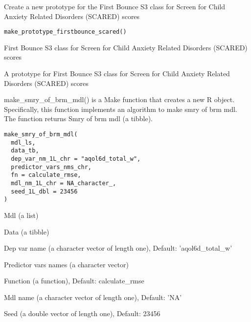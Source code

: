 \documentclass[a4paper]{book}
\begin{document}
%
\begin{Description}\relax
Create a new prototype for the First Bounce S3 class for Screen for Child Anxiety Related Disorders (SCARED) scores
\end{Description}
%
\begin{Usage}
\begin{verbatim}
make_prototype_firstbounce_scared()
\end{verbatim}
\end{Usage}
%
\begin{Details}\relax
First Bounce S3 class for Screen for Child Anxiety Related Disorders (SCARED) scores
\end{Details}
%
\begin{Value}
A prototype for First Bounce S3 class for Screen for Child Anxiety Related Disorders (SCARED) scores
\end{Value}
%
\begin{Description}\relax
make\_smry\_of\_brm\_mdl() is a Make function that creates a new R object. Specifically, this function implements an algorithm to make smry of brm mdl. The function returns Smry of brm mdl (a tibble).
\end{Description}
%
\begin{Usage}
\begin{verbatim}
make_smry_of_brm_mdl(
  mdl_ls,
  data_tb,
  dep_var_nm_1L_chr = "aqol6d_total_w",
  predictor_vars_nms_chr,
  fn = calculate_rmse,
  mdl_nm_1L_chr = NA_character_,
  seed_1L_dbl = 23456
)
\end{verbatim}
\end{Usage}
%
\begin{Arguments}
\begin{ldescription}
\item[\code{mdl\_ls}] Mdl (a list)

\item[\code{data\_tb}] Data (a tibble)

\item[\code{dep\_var\_nm\_1L\_chr}] Dep var name (a character vector of length one), Default: 'aqol6d\_total\_w'

\item[\code{predictor\_vars\_nms\_chr}] Predictor vars names (a character vector)

\item[\code{fn}] Function (a function), Default: calculate\_rmse

\item[\code{mdl\_nm\_1L\_chr}] Mdl name (a character vector of length one), Default: 'NA'

\item[\code{seed\_1L\_dbl}] Seed (a double vector of length one), Default: 23456
\end{ldescription}
\end{Arguments}
\end{document}
